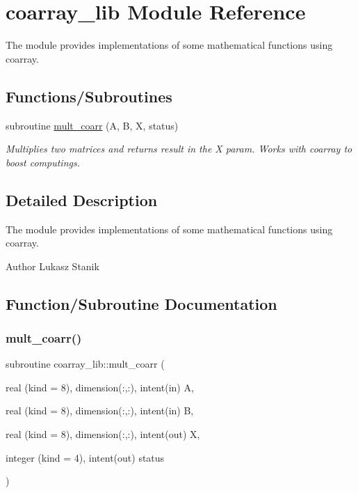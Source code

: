\hypertarget{namespacecoarray__lib}{}\section{coarray\+\_\+lib Module Reference}
\label{namespacecoarray__lib}


The module provides implementations of some mathematical functions using coarray.  


\subsection*{Functions/\+Subroutines}
\begin{DoxyCompactItemize}
\item 
subroutine \mbox{\hyperlink{namespacecoarray__lib_a834d78e243124fb4b218d9e17e71c033}{mult\+\_\+coarr}} (A, B, X, status)
\begin{DoxyCompactList}\small\item\em Multiplies two matrices and returns result in the {\ttfamily X} param. Works with coarray to boost computings. \end{DoxyCompactList}\end{DoxyCompactItemize}


\subsection{Detailed Description}
The module provides implementations of some mathematical functions using coarray. 

\begin{DoxyAuthor}{Author}
Lukasz Stanik 
\end{DoxyAuthor}


\subsection{Function/\+Subroutine Documentation}
\mbox{\label{namespacecoarray__lib_a834d78e243124fb4b218d9e17e71c033}} 
\subsubsection{\texorpdfstring{mult\+\_\+coarr()}{mult\_coarr()}}
{\footnotesize\ttfamily subroutine coarray\+\_\+lib\+::mult\+\_\+coarr (\begin{DoxyParamCaption}\item[{real (kind = 8), dimension(\+:,\+:), intent(in)}]{A,  }\item[{real (kind = 8), dimension(\+:,\+:), intent(in)}]{B,  }\item[{real (kind = 8), dimension(\+:,\+:), intent(out)}]{X,  }\item[{integer (kind = 4), intent(out)}]{status }\end{DoxyParamCaption})}



